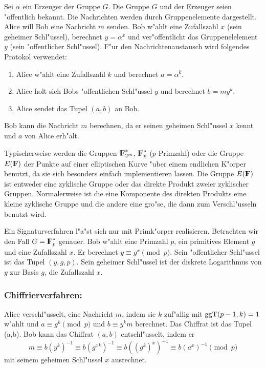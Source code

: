      Sei $\alpha$ ein Erzeuger der Gruppe $G$. Die Gruppe $G$ und der
     Erzeuger seien "offentlich bekannt. Die Nachrichten werden durch
     Gruppenelemente dargestellt. Alice will Bob eine Nachricht $m$ senden.
     Bob w"ahlt eine Zufallszahl $x$ (sein geheimer Schl"ussel), berechnet
     $y=\alpha^x$ und ver"offentlicht das Gruppenelelement $y$
     (sein "offentlicher Schl"ussel). F"ur den Nachrichtenaustausch
     wird folgendes Protokol verwendet:
     \begin{enumerate}
       \item Alice w"ahlt eine Zufallszahl $k$ und berechnet $a=\alpha^k$.
       \item Alice holt sich Bobs "offentlichen Schl"ussel $y$ und
         berechnet $b=m y^k$.
       \item Alice sendet das Tupel $(a, b)$ an Bob.
     \end{enumerate}
     Bob kann die Nachricht $m$ berechnen, da er seinen geheimen Schl"ussel
     $x$ kennt und $a$ von Alice erh"alt.

     Typischerweise werden die Gruppen $\F_{2^m}^*$, $\F_p^*$ ($p$ Primzahl) oder
     die Gruppe $E(\F)$ der Punkte auf einer elliptischen Kurve "uber einem endlichen
     K"orper benutzt, da sie sich besonders einfach implementieren lassen. Die Gruppe 
     $E(\F)$ ist entweder eine zyklische Gruppe oder
     das direkte Produkt zweier zyklischer Gruppen. Normalerweise ist die eine Komponente des
     direkten Produkts eine kleine zyklische Gruppe und die andere eine gro"se,
     die dann zum Verschl"usseln benutzt wird.
     
     Ein Signaturverfahren l"a"st sich nur mit Primk"orper realisieren. Betrachten
     wir den Fall $G=\F_p^*$ genauer. Bob w"ahlt eine Primzahl $p$, ein primitives 
     Element $g$ und eine Zufallszahl $x$. Er berechnet $y \equiv g^x \pmod{p}$. 
     Sein "offentlicher Schl"ussel ist das Tupel $(y,g,p)$. Sein geheimer Schl"ussel 
     ist der diskrete Logarithmus von $y$ zur Basis $g$, die Zufallszahl $x$.
    
     \subsubsection*{Chiffrierverfahren: }
       Alice verschl"usselt, eine Nachricht $m$, indem sie $k$ zuf"allig mit $\mbox{ggT}(p-1,k)=1$ 
       w"ahlt und $a \equiv g^k \pmod{p}$ und $b \equiv y^k m$ berechnet. Das Chiffrat
       ist das Tupel (a,b). Bob kann das Chiffrat $(a,b)$ entschl"usselt, indem er
       $$ m \equiv b (y^k)^{-1} \equiv b (g^{xk})^{-1} \equiv b ((g^k)^x)^{-1} \equiv b (a^x)^{-1} \pmod{p}$$
       mit seinem geheimen Schl"ussel $x$ ausrechnet.
     
